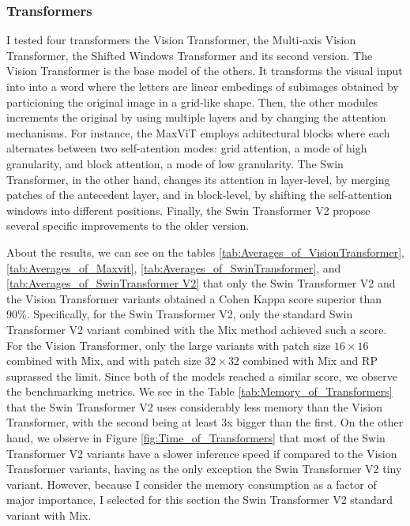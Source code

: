 \subsubsection{Transformers}

I tested four transformers the Vision Transformer, the Multi-axis Vision Transformer, the Shifted Windows Transformer and its second version. The Vision Transformer is the base model of the others. It transforms the visual input into into a word where the letters are linear embedings of subimages obtained by particioning the original image in a grid-like shape. Then, the other modules increments the original by using multiple layers and by changing the attention mechanisms. For instance, the MaxViT employs achitectural blocks where each alternates between two self-atention modes: grid attention, a mode of high granularity, and block attention, a mode of low granularity. The Swin Transformer, in the other hand, changes its attention in layer-level, by merging patches of the antecedent layer, and in block-level, by shifting the self-attention windows into different positions. Finally, the Swin Transformer V2 propose several specific improvements to the older version.

About the results, we can see on the tables \ref{tab:Averages_of_VisionTransformer}, \ref{tab:Averages_of_Maxvit}, \ref{tab:Averages_of_SwinTransformer}, and \ref{tab:Averages_of_SwinTransformer V2} that only the Swin Transformer V2 and the Vision Transformer variants obtained a Cohen Kappa score superior than 90\%. Specifically, for the Swin Transformer V2, only the standard Swin Transformer V2 variant combined with the \acrshort{Mix} method achieved such a score. For the Vision Transformer, only the large variants with patch size $16\times 16$ combined with \acrshort{Mix}, and with patch size $32 \times 32$ combined with \acrshort{Mix} and \acrshort{RP} suprassed the limit. Since both of the models reached a similar score, we observe the benchmarking metrics. We see in the Table \ref{tab:Memory_of_Transformers} that the Swin Transformer V2 uses considerably less memory than the Vision Transformer, with the second being at least 3x bigger than the first. On the other hand, we observe in Figure \ref{fig:Time_of_Transformers} that most of the Swin Transformer V2 variants have a slower inference speed if compared to the Vision Transformer variants, having as the only exception the Swin Transformer V2 tiny variant. However, because I consider the memory consumption as a factor of major importance, I selected for this section the Swin Transformer V2 standard variant with \acrshort{Mix}.

